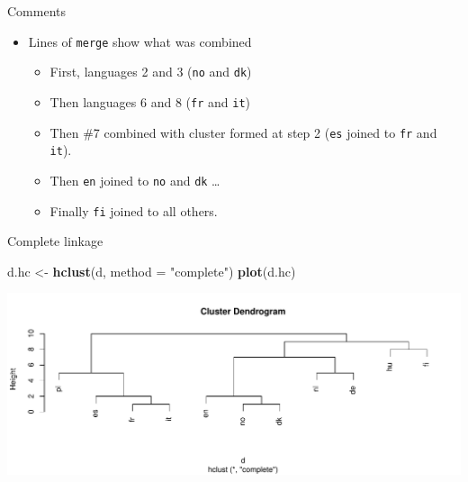 \documentclass[
  ignorenonframetext,
]{beamer}
\newenvironment{Shaded}{\begin{snugshade}}{\end{snugshade}}
\newcommand{\DataTypeTok}[1]{\textcolor[rgb]{0.13,0.29,0.53}{#1}}
\newcommand{\KeywordTok}[1]{\textcolor[rgb]{0.13,0.29,0.53}{\textbf{#1}}}
\newcommand{\NormalTok}[1]{#1}
\newcommand{\StringTok}[1]{\textcolor[rgb]{0.31,0.60,0.02}{#1}}
\begin{document}
\begin{frame}[fragile]{Comments}
\protect\hypertarget{comments-27}{}

\begin{itemize}
\item
  Lines of \texttt{merge} show what was combined

  \begin{itemize}
  \item
    First, languages 2 and 3 (\texttt{no} and \texttt{dk})
  \item
    Then languages 6 and 8 (\texttt{fr} and \texttt{it})
  \item
    Then \#7 combined with cluster formed at step 2 (\texttt{es} joined
    to \texttt{fr} and \texttt{it}).
  \item
    Then \texttt{en} joined to \texttt{no} and \texttt{dk} \ldots
  \item
    Finally \texttt{fi} joined to all others.
  \end{itemize}
\end{itemize}

\end{frame}

\begin{frame}[fragile]{Complete linkage}
\protect\hypertarget{complete-linkage-1}{}

\begin{Shaded}
\begin{Highlighting}[]
\NormalTok{d.hc <-}\StringTok{ }\KeywordTok{hclust}\NormalTok{(d, }\DataTypeTok{method =} \StringTok{"complete"}\NormalTok{)}
\KeywordTok{plot}\NormalTok{(d.hc)}
\end{Highlighting}
\end{Shaded}

\includegraphics{slides_d29_files/figure-beamer/unnamed-chunk-362-1.pdf}

\end{frame}
\end{document}
